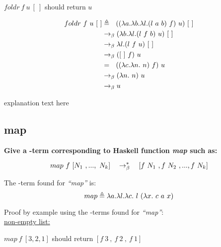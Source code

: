 \documentclass{article}
\begin{document}
\begin{Large}
		$foldr \ f \ u \ [ \ ]$ should return $u$
		
		\begin{align*}
			foldr \ f \ u \ [ \ ] &\triangleq \, \, \, \, ((\lambda a.\lambda b.\lambda l.(l \ a \ b) \ f) \ u) \ [ \ ] \\
			&\rightarrow_\beta (\lambda b.\lambda l.(l \ f \ b) \ u) \ [ \ ] \\
			&\rightarrow_\beta \lambda l.(l \ f \ u) \ [ \ ] \\
			&\rightarrow_\beta ([ \ ] \ f) \ u \\
			&= \, \, \, \,  ((\lambda c.\lambda n. \ n) \ f )\ u \\
			&\rightarrow_\beta (\lambda n. \ n) \ u \\
			&\rightarrow_\beta u
		\end{align*}
		
		explanation text here
		\newline
		
		
	\subsection{map}
		
		\textbf{Give a \lamb -term corresponding to Haskell function \textit{map} such as:}
		
		\begin{equation*}
			map \ f \ [N_1\ ,..., \ N_k] \quad \rightarrow_\beta^*\quad [f \ N_1 \ , f \ N_2 \ ,...,f \ N_k]
		\end{equation*}
		\newline
		
		The \lamb -term found for \textit{``map''} is:
		\begin{equation*}
			map \triangleq \la a.\la l.\la c. \ l \ (\la x.\ c \ a \ x)
		\end{equation*}
		\newline
		
		Proof by example using the \lamb -terms found for  \textit{``map''}:\\
		
		\underline{non-empty list:}
		\newline
		
		$map \ f \ [3,2,1]$ should return $ [f \ 3 \ , \ f \ 2 \ , \  f \ 1]$
		

\end{Large}
\end{document}
